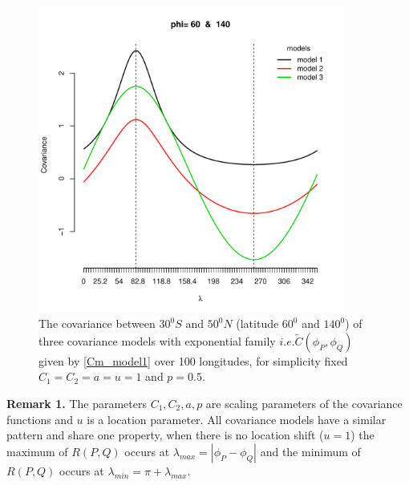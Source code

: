 			\begin{figure}[H]
				\centering
				\includegraphics[width=0.9\textwidth]{graphs/all_covariance_models}
				\caption[The covariance between $30^0S$ and $50^0N$ (latitude $60^0$ and $140^0$) of three] {The covariance between $30^0S$ and $50^0N$ (latitude $60^0$ and $140^0$) of three covariance models with exponential family $ i.e. \tilde{C}(\phi_P, \phi_Q)$ given by \ref{Cm_model1} over 100 longitudes, for simplicity fixed $C_1 = C_2 = a = u = 1$ and $p = 0.5$.}
			\end{figure}
				
{\bf Remark 1.} The parameters $C_1, C_2, a, p$ are scaling parameters of the covariance functions and $u$ is a location parameter. All covariance models have a similar pattern and share one property, when there is no location shift ($u = 1$) the maximum of $R(P,Q)$ occurs at $\lambda_{max} = |\phi_P -\phi_Q|$ and the minimum of $R(P,Q)$ occurs at $\lambda_{min} = \pi + \lambda_{max}$.  \\
					
